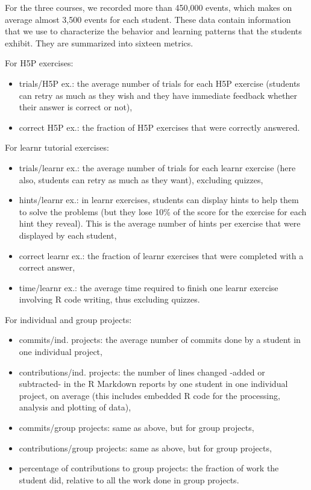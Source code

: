 \documentclass{aims}
\theoremstyle{definition}
\begin{document}
For the three courses, we recorded more than 450,000 events, which makes
on average almost 3,500 events for each student. These data contain
information that we use to characterize the behavior and learning
patterns that the students exhibit. They are summarized into sixteen
metrics.

For H5P exercises:

\begin{itemize}
\item
  trials/H5P ex.: the average number of trials for each H5P exercise
  (students can retry as much as they wish and they have immediate
  feedback whether their answer is correct or not),
\item
  correct H5P ex.: the fraction of H5P exercises that were correctly
  answered.
\end{itemize}

For learnr tutorial exercises:

\begin{itemize}
\item
  trials/learnr ex.: the average number of trials for each learnr
  exercise (here also, students can retry as much as they want),
  excluding quizzes,
\item
  hints/learnr ex.: in learnr exercises, students can display hints to
  help them to solve the problems (but they lose 10\% of the score for
  the exercise for each hint they reveal). This is the average number of
  hints per exercise that were displayed by each student,
\item
  correct learnr ex.: the fraction of learnr exercises that were
  completed with a correct answer,
\item
  time/learnr ex.: the average time required to finish one learnr
  exercise involving R code writing, thus excluding quizzes.
\end{itemize}

For individual and group projects:

\begin{itemize}
\item
  commits/ind. projects: the average number of commits done by a student
  in one individual project,
\item
  contributions/ind. projects: the number of lines changed -added or
  subtracted- in the R Markdown reports by one student in one individual
  project, on average (this includes embedded R code for the processing,
  analysis and plotting of data),
\item
  commits/group projects: same as above, but for group projects,
\item
  contributions/group projects: same as above, but for group projects,
\item
  percentage of contributions to group projects: the fraction of work
  the student did, relative to all the work done in group projects.
\end{itemize}
\end{document}
